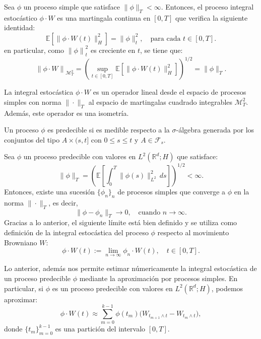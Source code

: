 \begin{prop}[]
  Sea $\phi$ un proceso simple que satisface $\|\phi\|_T < \infty$. Entonces, el proceso integral estocástico $\phi \cdot W$ es una martingala continua en $[0,T]$ que verifica la siguiente identidad:
  \[
    \mathbb{E}\left[\|\phi \cdot W(t)\|_H^2\right] = \|\phi\|_t^2, \quad \text{para cada } t \in [0,T].
  \]
  en particular, como $\left\|\phi\right\|_t^2$ es creciente en $t$, se tiene que:
  \[
    \left\|\phi \cdot W\right\|_{\mathcal{M}_T^2} = \left(\sup_{t \in [0, T]}\mathbb{E}\left[\|\phi \cdot W(t)\|_H^2\right]\right)^{1/2} = \|\phi\|_T.
  \]
\end{prop}

\begin{obs}[]
  La integral estocástica $\phi \cdot W$ es un operador lineal desde el espacio de procesos simples con norma $\|\cdot\|_T$ al espacio de martingalas cuadrado integrables $\mathcal{M}_T^2$. Además, este operador es una isometría.
\end{obs}

\begin{defn}
  Un proceso $\phi$ es predecible si es medible respecto a la $\sigma$-álgebra generada por los conjuntos del tipo $A \times (s,t]$ con $0 \leq s \leq t$ y $A \in \mathcal{F}_s$.
\end{defn}

\begin{prop}
  Sea $\phi$ un proceso predecible con valores en $L^2(\mathbb{R}^d; H)$ que satisface:
  \[
    \|\phi\|_T = \left(\mathbb{E}\left[\int_0^T \|\phi(s)\|_{L^2}^2\, ds\right]\right)^{1/2} < \infty.
  \]
  Entonces, existe una sucesión $\{\phi_n\}_n$ de procesos simples que converge a $\phi$ en la norma $\|\cdot\|_T$, es decir,
  \[
    \|\phi - \phi_n\|_T \rightarrow 0, \quad \text{cuando } n \rightarrow \infty.
  \]
  Gracias a lo anterior, el siguiente límite está bien definido y se utiliza como definición de la integral estocástica del proceso $\phi$ respecto al movimiento Browniano $W$:
  \[
    \phi \cdot W(t) := \lim_{n \rightarrow \infty}\phi_n \cdot W(t), \quad t \in [0,T].
  \]
\end{prop}

\begin{obs}[]
  Lo anterior, además nos permite estimar númericamente la integral estocástica de un proceso predecible $\phi$ mediante la aproximación por procesos simples. En particular, si $\phi$ es un proceso predecible con valores en $L^2(\mathbb{R}^d; H)$, podemos aproximar:
  \[
    \phi \cdot W(t) \approx \sum_{m=0}^{k-1} \phi(t_m)\bigl(W_{t_{m+1} \wedge t} - W_{t_m \wedge t}\bigr),
  \]
  donde $\{t_m\}_{m=0}^{k-1}$ es una partición del intervalo $[0,T]$.
\end{obs}

